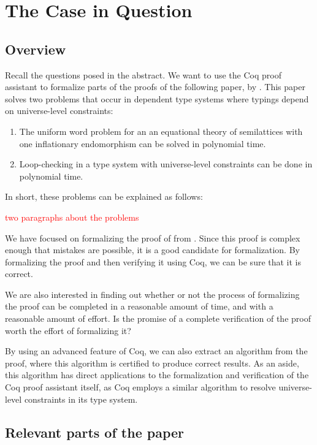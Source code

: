 \chapter{The Case in Question}
\label{ch:the_case_in_question}

\section{Overview}
\label{sec:overview}

Recall the questions posed in the abstract.
We want to use the Coq proof assistant to formalize parts of the proofs of the following paper, by \citeauthor{mbezem} \cite{mbezem}.
This paper solves two problems that occur in dependent type systems where typings depend
on universe-level constraints:

\begin{enumerate}
    \item The uniform word problem for an an equational theory of semilattices
          with one inflationary endomorphism can be solved in polynomial time.
    \item Loop-checking in a type system with universe-level constraints
          can be done in polynomial time.
\end{enumerate}

In short, these problems can be explained as follows:

\textcolor{red}{two paragraphs about the problems}

We have focused on formalizing the proof of  from \cite{mbezem}.
Since this proof is complex enough that mistakes are possible, it is a good candidate for formalization.
By formalizing the proof and then verifying it using Coq, we can be sure that it is correct.

We are also interested in finding out whether or not the process of formalizing the proof
can be completed in a reasonable amount of time, and with a reasonable amount of effort.
Is the promise of a complete verification of the proof worth the effort of formalizing it?

By using an advanced feature of Coq, we can also extract an algorithm from the proof,
where this algorithm is certified to produce correct results.
As an aside, this algorithm has direct applications to the formalization and verification of the Coq proof assistant itself,
as Coq employs a similar algorithm to resolve universe-level constraints in its type system.

\section{Relevant parts of the paper}
\label{sec:relevant_parts_of_the_paper}

